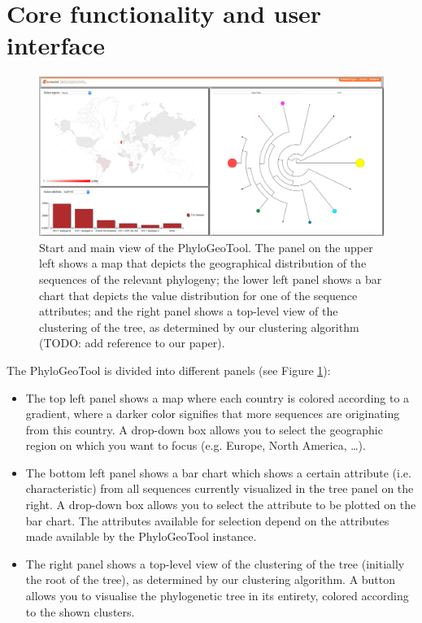 \documentclass[a4paper, 11pt]{article} %
\begin{document}
\section{Core functionality and user interface}
\begin{figure}[H]
\centering
\includegraphics[scale=0.1875]{images/initial_view.PNG}
\vspace{-0.75cm}
\caption{Start and main view of the PhyloGeoTool. 
The panel on the upper left shows a map that depicts the geographical distribution of the sequences of the relevant phylogeny; the lower left panel shows a bar chart that depicts the value distribution for one of the sequence attributes; and the right panel shows a top-level view of the clustering of the tree, as determined by our clustering algorithm (TODO: add reference to our paper).}
\label{fig:initialview}
\end{figure}

The PhyloGeoTool is divided into different panels (see Figure \ref{fig:initialview}): 
\begin{itemize}
  \item The top left panel shows a map where each country is colored according to a gradient, where a darker color signifies that more sequences are originating from this country. 
  A drop-down box allows you to select the geographic region on which you want to focus (e.g. Europe, North America, \ldots).
  \item The bottom left panel shows a bar chart which shows a certain attribute (i.e. characteristic) from all sequences currently visualized in the tree panel on the right. 
  A drop-down box allows you to select the attribute to be plotted on the bar chart. 
  The attributes available for selection depend on the attributes made available by the PhyloGeoTool instance.
  \item The right panel shows a top-level view of the clustering of the tree (initially the root of the tree), as determined by our clustering algorithm. %
  A button allows you to visualise the phylogenetic tree in its entirety, colored according to the shown clusters.
\end{itemize}
\end{document}
